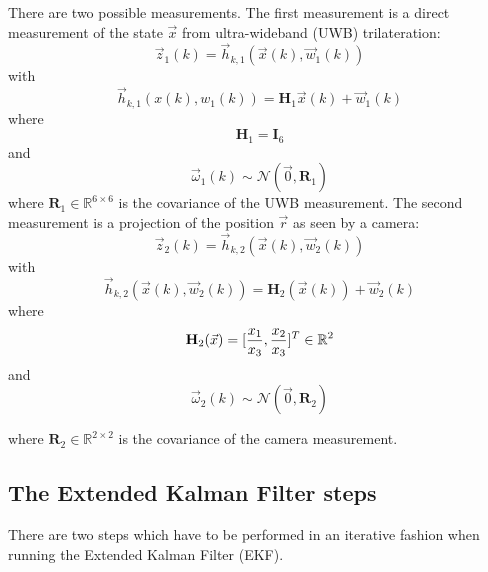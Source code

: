 There are two possible measurements. The first measurement is a direct measurement of the state $\vec x$ from ultra-wideband (UWB) trilateration:
\begin{equation}
	\vec z_1(k) = \vec h_{k,1}(\vec x(k), \vec w_1(k))
\end{equation}
with
\begin{equation}
  \vec h_{k,1}(x(k), w_1(k)) = \textbf{H}_1 \vec x(k) + \vec w_1(k)
\end{equation}
where
$$\textbf{H}_1 = \textbf{I}_6$$
and
$$\vec \omega_1(k) \sim \mathcal{N}(\vec 0, \textbf{R}_1)$$
where $\textbf{R}_1 \in \mathbb{R}^{6\times6}$ is the covariance of the UWB measurement.
The second measurement is a projection of the position $\vec r$ as seen by a camera:
\begin{equation}
	\vec z_2(k) = \vec h_{k,2}(\vec x(k), \vec w_2(k))
\end{equation}
with
\begin{equation}
  \vec h_{k,2}(\vec x(k), \vec w_2(k)) = \textbf{H}_2(\vec x(k)) + \vec w_2(k)
\end{equation}
where
\begin{equation}
	\textbf{H}_2(\vec x) = [\frac{x_1}{x_3}, \frac{x_2}{x_3}]^T \in \mathbb{R}^2\\
\end{equation}
and
\begin{equation}
  \vec \omega_2(k) \sim \mathcal{N}(\vec 0, \textbf{R}_2)
\end{equation}

where $\textbf{R}_2 \in \mathbb{R}^{2\times2}$ is the covariance of the camera measurement.

\subsection{The Extended Kalman Filter steps}
There are two steps which have to be performed in an iterative fashion when running the Extended Kalman Filter (EKF).

